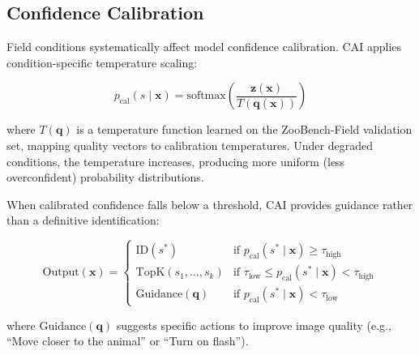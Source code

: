 \subsection{Confidence Calibration}

Field conditions systematically affect model confidence calibration.
CAI applies condition-specific temperature scaling:

\begin{equation}
    p_{\text{cal}}(s \mid \mathbf{x}) = \text{softmax}\left(\frac{\mathbf{z}(\mathbf{x})}{T(\mathbf{q}(\mathbf{x}))}\right)
\end{equation}

\noindent where $T(\mathbf{q})$ is a temperature function learned on the ZooBench-Field validation set, mapping quality vectors to calibration temperatures.
Under degraded conditions, the temperature increases, producing more uniform (less overconfident) probability distributions.

When calibrated confidence falls below a threshold, CAI provides guidance rather than a definitive identification:

\begin{equation}
    \text{Output}(\mathbf{x}) = \begin{cases}
        \text{ID}(s^*) & \text{if } p_{\text{cal}}(s^* \mid \mathbf{x}) \geq \tau_{\text{high}} \\
        \text{TopK}(s_1, \ldots, s_k) & \text{if } \tau_{\text{low}} \leq p_{\text{cal}}(s^* \mid \mathbf{x}) < \tau_{\text{high}} \\
        \text{Guidance}(\mathbf{q}) & \text{if } p_{\text{cal}}(s^* \mid \mathbf{x}) < \tau_{\text{low}}
    \end{cases}
\end{equation}

\noindent where $\text{Guidance}(\mathbf{q})$ suggests specific actions to improve image quality (e.g., ``Move closer to the animal'' or ``Turn on flash'').

